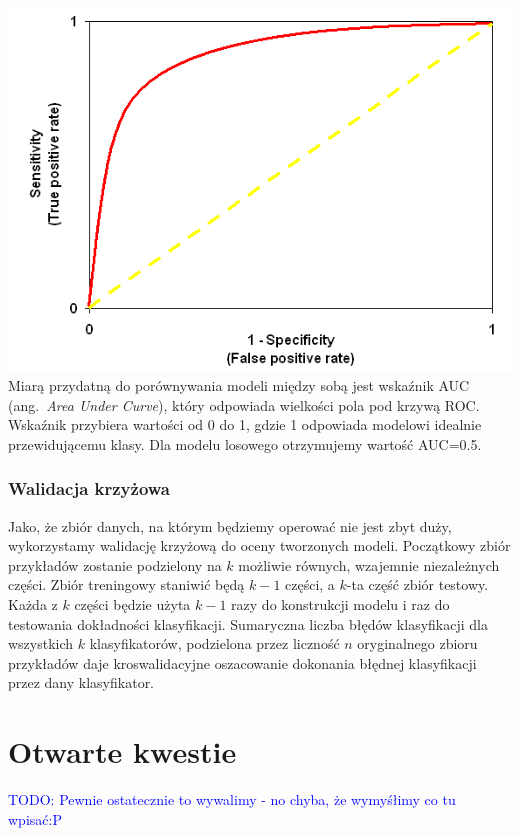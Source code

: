 \documentclass{article}
\newcommand{\TODO}[1]{\textcolor{blue}{TODO: #1}}
\newcommand{\ang}[1]{ang.~{\itshape #1}}
\begin{document}
\includegraphics[scale=0.55]{../pictures/decoy4}\\

Miarą przydatną do porównywania modeli między sobą jest wskaźnik AUC (\ang{Area Under Curve}), który odpowiada wielkości pola pod krzywą ROC. Wskaźnik przybiera wartości od 0 do 1, gdzie 1 odpowiada modelowi idealnie przewidującemu klasy. Dla modelu losowego otrzymujemy wartość AUC=0.5.

\subsubsection{Walidacja krzyżowa}
Jako, że zbiór danych, na którym będziemy operować nie jest zbyt duży, wykorzystamy walidację krzyżową do oceny tworzonych modeli. Początkowy zbiór przykładów zostanie podzielony na $k$ możliwie równych, wzajemnie niezależnych części. Zbiór treningowy staniwić będą $k-1$ części, a $k$-ta część zbiór testowy. Każda z $k$ części będzie użyta $k-1$ razy do konstrukcji modelu i raz do testowania dokładności klasyfikacji. Sumaryczna liczba błędów klasyfikacji dla wszystkich $k$ klasyfikatorów, podzielona przez liczność $n$ oryginalnego zbioru przykładów daje kroswalidacyjne oszacowanie dokonania błędnej klasyfikacji przez dany klasyfikator.

\section{Otwarte kwestie}
\TODO{Pewnie ostatecznie to wywalimy - no chyba, że wymyśłimy co tu wpisać:P}
\end{document}
